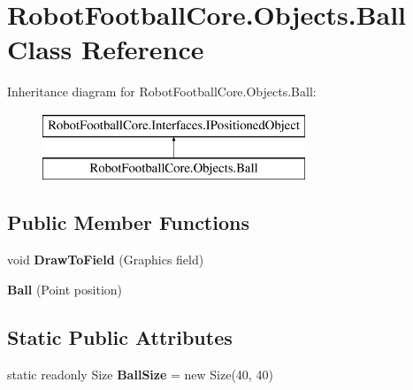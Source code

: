 \hypertarget{class_robot_football_core_1_1_objects_1_1_ball}{\section{Robot\-Football\-Core.\-Objects.\-Ball Class Reference}
\label{class_robot_football_core_1_1_objects_1_1_ball}
}
Inheritance diagram for Robot\-Football\-Core.\-Objects.\-Ball\-:\begin{figure}[H]
\begin{center}
\leavevmode
\includegraphics[height=2.000000cm]{class_robot_football_core_1_1_objects_1_1_ball}
\end{center}
\end{figure}
\subsection*{Public Member Functions}
\begin{DoxyCompactItemize}
\item 
\hypertarget{class_robot_football_core_1_1_objects_1_1_ball_aa69a22dd4914d4c297d84d7634efdfc3}{void {\bfseries Draw\-To\-Field} (Graphics field)}\label{class_robot_football_core_1_1_objects_1_1_ball_aa69a22dd4914d4c297d84d7634efdfc3}

\item 
\hypertarget{class_robot_football_core_1_1_objects_1_1_ball_a3093d5a50afeeef5df3aaf8ba5bb8dcc}{{\bfseries Ball} (Point position)}\label{class_robot_football_core_1_1_objects_1_1_ball_a3093d5a50afeeef5df3aaf8ba5bb8dcc}

\end{DoxyCompactItemize}
\subsection*{Static Public Attributes}
\begin{DoxyCompactItemize}
\item 
\hypertarget{class_robot_football_core_1_1_objects_1_1_ball_ad863c1785e78895df5e2b15fc4e526fc}{static readonly Size {\bfseries Ball\-Size} = new Size(40, 40)}\label{class_robot_football_core_1_1_objects_1_1_ball_ad863c1785e78895df5e2b15fc4e526fc}

\end{DoxyCompactItemize}
